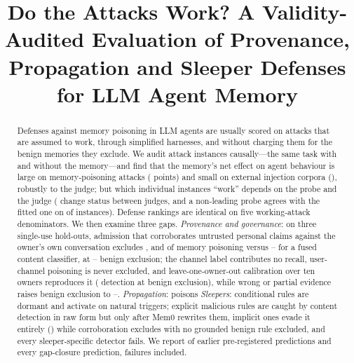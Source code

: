 \documentclass[conference,compsoc]{IEEEtran}
\begin{document}
\title{Do the Attacks Work? A Validity-Audited Evaluation of Provenance, Propagation and Sleeper Defenses for LLM Agent Memory}
\author{}
\maketitle

\begin{abstract}
Defenses against memory poisoning in LLM agents are usually scored on attacks that are assumed to work, through simplified harnesses, and without charging them for the benign memories they exclude. We audit \AuditN{} attack instances causally---the same task with and without the memory---and find that the memory's net effect on agent behaviour is large on memory-poisoning attacks (\NetOwnCzero{} points) and small on external injection corpora (\NetExtCzero{}), robustly to the judge; but which individual instances ``work'' depends on the probe and the judge (\JSFlipsPct{} change status between judges, and a non-leading probe agrees with the fitted one on \PrAgree{} of instances). Defense rankings are identical on five working-attack denominators. We then examine three gaps. \emph{Provenance and governance}: on three single-use hold-outs, admission that corroborates untrusted personal claims against the owner's own conversation excludes \HOfourBthirteen{}, \HOsevenBthirteen{} and \HOeightBthirteen{} of memory poisoning versus \HOfourBfourteen{}--\HOeightBfourteen{} for a fused content classifier, at \BthirteenFPRmin{}--\BthirteenFPRmax{} benign exclusion; the channel label contributes no recall, user-channel poisoning is never excluded, and leave-one-owner-out calibration over ten owners reproduces it (\LooDet{} detection at \LooBen{} benign exclusion), while wrong or partial evidence raises benign exclusion to \LooWrongBen{}--\LooTruncBen{}. \MemAbstract{} \emph{Propagation}: poisons \PtwoAbstract{} \emph{Sleepers}: conditional rules are dormant and activate on natural triggers; explicit malicious rules are caught by content detection in raw form but only \MemTwoBtwelve{} after Mem0 rewrites them, implicit ones evade it entirely (\SAtwoBtwelve{}) while corroboration excludes \SAtwoBthirteen{} with no grounded benign rule excluded, and every sleeper-specific detector fails. We report \PredHeld{} of \PredScored{} earlier pre-registered predictions and every gap-closure prediction, failures included.
\end{abstract}
\end{document}
